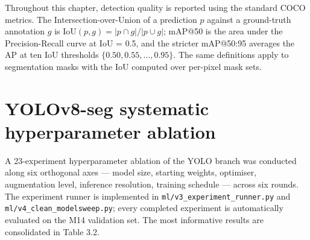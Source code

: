Throughout this chapter, detection quality is reported using the standard COCO metrics. The Intersection-over-Union of a prediction \(p\) against a ground-truth annotation \(g\) is \(\mathrm{IoU}(p, g) = |p \cap g| / |p \cup g|\); mAP@50 is the area under the Precision-Recall curve at IoU = 0.5, and the stricter mAP@50:95 averages the AP at ten IoU thresholds \(\{0.50, 0.55, \ldots, 0.95\}\). The same definitions apply to segmentation masks with the IoU computed over per-pixel mask sets.

\section{YOLOv8-seg systematic hyperparameter ablation}\label{yolov8-seg-systematic-hyperparameter-ablation}

A 23-experiment hyperparameter ablation of the YOLO branch was conducted along six orthogonal axes --- model size, starting weights, optimiser, augmentation level, inference resolution, training schedule --- across six rounds. The experiment runner is implemented in \texttt{ml/v3\_experiment\_runner.py} and \texttt{ml/v4\_clean\_modelsweep.py}; every completed experiment is automatically evaluated on the M14 validation set. The most informative results are consolidated in Table 3.2.

